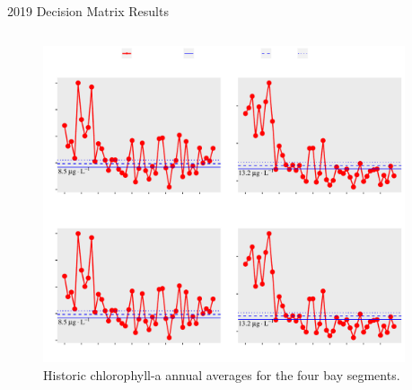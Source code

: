 \documentclass[final,t]{beamer}\usepackage[]{graphicx}\usepackage[]{color}
\begin{document}
\begin{frame}
\begin{columns}[t]
\begin{column}{.63\linewidth}
\begin{block}{2019 Decision Matrix Results}
\begin{minipage}{0.55\textwidth}
\end{minipage}

\end{block}

\vspace{-0.2in}

\begin{columns}[t]



\begin{column}{0.6\textwidth}

\begin{figure}
\centerline{\includegraphics[trim = 0cm 0cm 0cm 0cm, width=1\linewidth]{figure/thrplot.pdf}}
\caption{\footnotesize Historic chlorophyll-a annual averages for the four bay segments.}
\label{fig:thrplot}
\end{figure}

\end{column}



\begin{column}{0.35\textwidth}


\end{column}
\end{columns}
\end{column}
\end{columns}
\end{frame}
\end{document}
